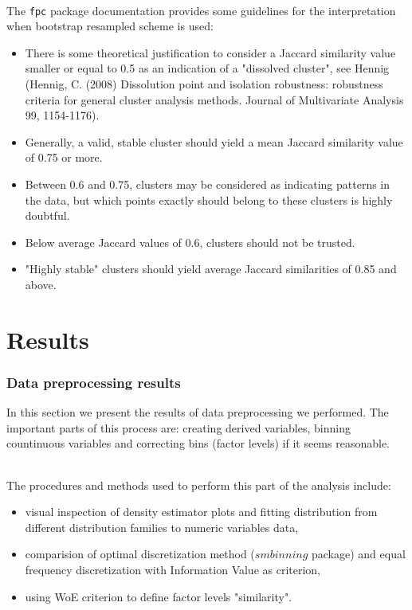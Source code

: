 \documentclass[10pt]{article}\usepackage[]{graphicx}\usepackage[]{color}
\begin{document}
\paragraph{}
The \texttt{fpc} package documentation provides some guidelines for the interpretation
when bootstrap resampled scheme is used: 
\begin{itemize}
\item There is some theoretical justification to consider a Jaccard similarity value smaller or equal to 0.5 as an indication of a "dissolved cluster", see Hennig (Hennig, C. (2008) Dissolution point and isolation robustness: robustness criteria for general cluster
analysis methods. Journal of Multivariate Analysis 99, 1154-1176). 
\item Generally, a valid, stable cluster should yield a mean Jaccard similarity value of 0.75 or more. 
\item Between 0.6 and 0.75, clusters may be considered as indicating patterns in the data, but
which points exactly should belong to these clusters is highly doubtful. 
\item Below average Jaccard values of 0.6, clusters should not be trusted. 
\item "Highly stable" clusters should yield average Jaccard similarities of 0.85 and above. 
\end{itemize}




\clearpage
\part{Results}

\clearpage
\section{Data preprocessing results}
In this section we present the results of data preprocessing we performed. The important parts of this process are: creating derived variables, binning countinuous variables and correcting bins (factor levels) if it seems reasonable. 
\paragraph{}
The procedures and methods used to perform this part of the analysis include:
\begin{itemize}
\item visual inspection of density estimator plots and fitting distribution from different distribution families to numeric variables data,
\item comparision of optimal discretization method ($smbinning$ package) and equal frequency discretization with Information Value as criterion,
\item using WoE criterion to define factor levels "similarity".
\end{itemize}
\end{document}
